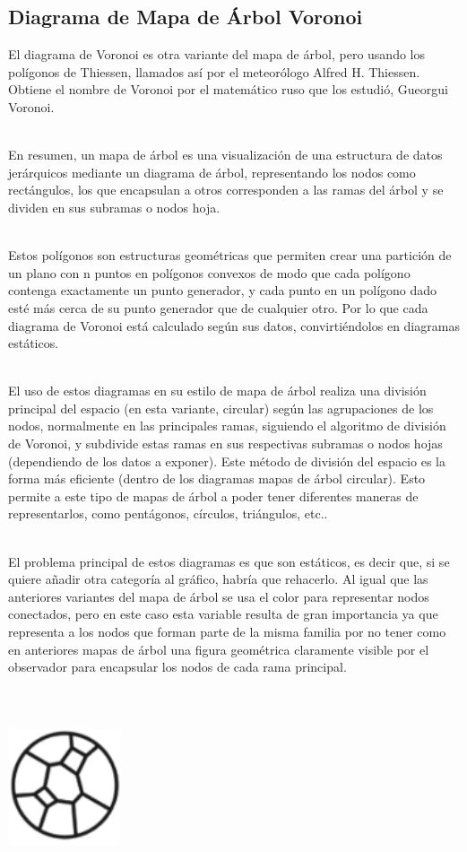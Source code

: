 \documentclass{article}\usepackage[]{graphicx}\usepackage[]{color}
\begin{document}
\subsection{Diagrama de Mapa de \'Arbol Voronoi}
El diagrama de Voronoi es otra variante del mapa de \'arbol, pero usando los pol\'igonos de Thiessen, llamados as\'i por el meteor\'ologo Alfred H. Thiessen. Obtiene el nombre de Voronoi por el matem\'atico ruso que los estudi\'o, Gueorgui Voronoi.~\\~\par
En resumen, un mapa de \'arbol es una visualizaci\'on de una estructura de datos jer\'arquicos mediante un diagrama de \'arbol, representando los nodos como rect\'angulos, los que encapsulan a otros corresponden a las ramas del \'arbol y se dividen en sus subramas o nodos hoja\cite{tree-map}.~\\~\par
Estos pol\'igonos son estructuras geom\'etricas que permiten crear una partici\'on de un plano con n puntos en pol\'igonos convexos de modo que cada pol\'igono contenga exactamente un punto generador, y cada punto en un pol\'igono dado est\'e m\'as cerca de su punto generador que de cualquier otro\cite{mat-voronoi}. Por lo que cada diagrama de Voronoi est\'a calculado seg\'un sus datos, convirti\'endolos en diagramas est\'aticos.~\\~\par
El uso de estos diagramas en su estilo de mapa de \'arbol realiza una divisi\'on principal del espacio (en esta variante, circular) seg\'un las agrupaciones de los nodos, normalmente en las principales ramas, siguiendo el algoritmo de divisi\'on de Voronoi, y subdivide estas ramas en sus respectivas subramas o nodos hojas (dependiendo de los datos a exponer). Este m\'etodo de divisi\'on del espacio es la forma m\'as eficiente (dentro de los diagramas mapas de \'arbol circular). Esto permite a este tipo de mapas de \'arbol a poder tener diferentes maneras de representarlos, como pent\'agonos, c\'irculos, tri\'angulos, etc.\cite{tree-voronoi}.~\\~\par
El problema principal de estos diagramas es que son est\'aticos, es decir que, si se quiere a\~nadir otra categor\'ia al gr\'afico, habr\'ia que rehacerlo. Al igual que las anteriores variantes del mapa de \'arbol se usa el color para representar nodos conectados, pero en este caso esta variable resulta de gran importancia ya que representa a los nodos que forman parte de la misma familia por no tener como en anteriores mapas de \'arbol una figura geom\'etrica claramente visible por el observador para encapsular los nodos de cada rama principal.
~\\~\\~\\~\\
\vbox{
    \centering
    \includegraphics[width=0.25\textwidth]{imag/poli}
}
\clearpage
\end{document}
